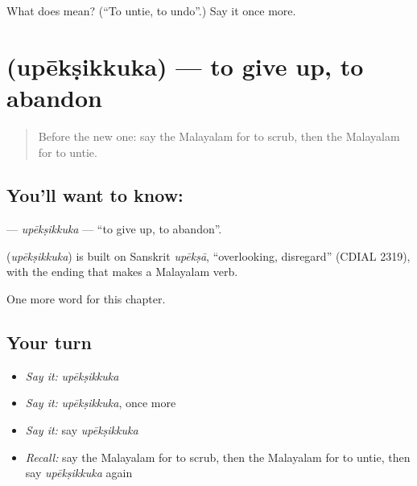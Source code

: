 \begin{tcolorbox}[breakable,colback=teal!4,colframe=teal!35!black,title={Before you move on}]
What does  mean? (\textquotedblleft{}To untie, to undo\textquotedblright{}.) Say it once more.
\end{tcolorbox}
\section[\texorpdfstring{\ml{ഉപേക്ഷിക്കുക} (upēkṣikkuka)}{ഉപേക്ഷിക്കുക (upēkṣikkuka)}]{ (upēkṣikkuka) — to give up, to abandon}

\label{lesson:ML-C310-upeksikkuka}



\begin{quote}
Before the new one: say the Malayalam for to scrub, then the Malayalam for to untie.
\end{quote}

\subsection*{You'll want to know: }
\textbf{} — \emph{upēkṣikkuka} — \textquotedblleft{}to give up, to abandon\textquotedblright{}.

\begin{cousinweb}
\textbf{} (\emph{upēkṣikkuka}) is built on Sanskrit \emph{upēkṣā}, \textquotedblleft{}overlooking, disregard\textquotedblright{} (CDIAL 2319), with the ending that makes a Malayalam verb.
\end{cousinweb}

\begin{grammarlens}[title={What you've built}]
One more word for this chapter.
\end{grammarlens}

\subsection*{Your turn}
\begin{itemize}
\raggedright
  \item \emph{Say it:} \emph{upēkṣikkuka}
  \item \emph{Say it:} \emph{upēkṣikkuka}, once more
  \item \emph{Say it:} say \emph{upēkṣikkuka}
  \item \emph{Recall:} say the Malayalam for to scrub, then the Malayalam for to untie, then say \emph{upēkṣikkuka} again
\end{itemize}

